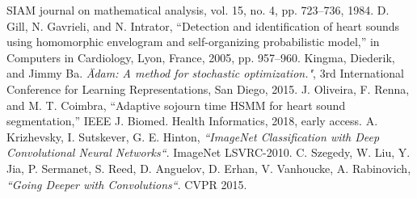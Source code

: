 \begin{thebibliography}{9}
  SIAM journal on mathematical analysis, vol. 15, no. 4, pp. 723–736, 1984.
  D. Gill, N. Gavrieli, and N. Intrator, “Detection and identification of heart sounds using homomorphic envelogram
  and self-organizing probabilistic model,” in Computers in Cardiology, Lyon, France, 2005, pp. 957–960.
  Kingma, Diederik, and Jimmy Ba. \textit{\" Adam: A method for stochastic optimization."}, 3rd International
  Conference for Learning Representations, San Diego, 2015.
  J. Oliveira, F. Renna, and M. T. Coimbra, “Adaptive sojourn time HSMM for heart sound segmentation,” IEEE J. Biomed.
  Health Informatics, 2018, early access.
  A. Krizhevsky, I. Sutskever, G. E. Hinton, \textit{``ImageNet Classification with Deep Convolutional
  Neural Networks``}. ImageNet LSVRC-2010.
  C. Szegedy, W. Liu, Y. Jia, P. Sermanet, S. Reed, D. Anguelov, D. Erhan, V. Vanhoucke, A. Rabinovich,
  \textit{``Going Deeper with Convolutions``}. CVPR 2015.
\end{thebibliography}
